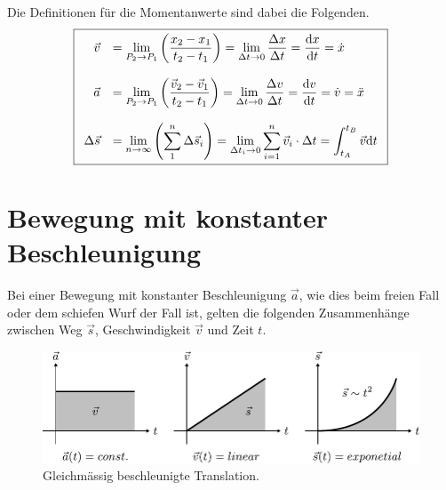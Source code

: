 \noindent
Die Definitionen für die Momentanwerte sind dabei die Folgenden.
\[\boxed{\begin{array}{r l}
	\vec{v}	&
		= \displaystyle \lim\limits_{P_2 \rightarrow P_1} 
			{\left( \frac{x_2 - x_1}{t_2 - t_1} \right)}
		= \displaystyle \lim\limits_{\Delta t \rightarrow 0}
			{\frac{\Delta x}{\Delta t}}
		= \displaystyle \frac{\mathrm{d}x}{\mathrm{d}t}=\dot{x} \\
	& \\
	\vec{a} &
		= \displaystyle \lim\limits_{P_2 \rightarrow P_1}
			{\left( \frac{\vec{v}_2 
			- \vec{v}_1}{t_2 - t_1} \right)}
		= \displaystyle \lim\limits_{\Delta t \rightarrow 0}
			{\frac{\Delta v}{\Delta t}}
		= \displaystyle \frac{\mathrm{d}v}{\mathrm{d}t}
		= \displaystyle \dot{v}
		= \ddot{x} \\
	& \\
	\Delta \vec{s} &
		= \displaystyle \lim\limits_{n \rightarrow \infty}
			{\left( \sum_{1}^{n} \Delta \vec{s}_i \right)}
		= \displaystyle \lim\limits_{\Delta t_i \rightarrow 0}
			{\sum^{n}_{i=1}\vec{v}_i\cdot\Delta t}
		= \displaystyle \int_{t_A}^{t_B}\vec{v}\mathrm{d}t
\end{array}}\]

\section{Bewegung mit konstanter Beschleunigung}
Bei einer Bewegung mit konstanter Beschleunigung $\vec{a}$, wie dies beim
freien Fall oder dem schiefen Wurf der Fall ist, gelten die folgenden
Zusammenhänge zwischen Weg $\vec{s}$, Geschwindigkeit $\vec{v}$ und 
Zeit $t$.

\begin{figure}[h!]
	\centering
	\includegraphics[scale=0.7]{bewegung.pdf}
	\caption{Gleichmässig beschleunigte Translation.}
	\label{fig:bewegung}
\end{figure}

